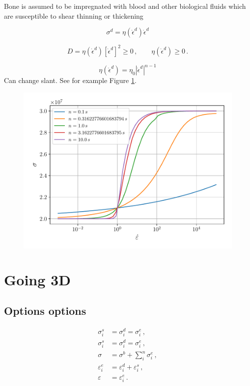 \documentclass[12pt]{article}
\begin{document}
Bone is assumed to be impregnated with blood and other biological fluids which are susceptible to shear thinning or thickening

\begin{equation}
	\sigma^{d} = \eta(\dot{\epsilon}^{d})\dot{\epsilon}^{d}
\end{equation}

\begin{equation}
	D = \eta(\dot{\epsilon}^{d})\left[\dot{\epsilon}^{d}\right]^{2} \geq 0 \,, \qquad \eta(\dot{\epsilon}^{d})\geq 0\,.
\end{equation}

\begin{equation}
	\eta(\dot{\epsilon}^{d}) = \eta_{0} |\dot{\epsilon}^{d}|^{n-1}
\end{equation}
Can change slant. See for example Figure \ref{fig:odw}.
\begin{figure}[!htb]
	\centering
	\includegraphics[width=0.65\linewidth]{odw}
	\caption{ }
	\label{fig:odw}	
\end{figure}

\section{Going 3D}

\subsection{Options options}

\begin{align}
	\sigma^{s}_{i} &= \sigma^{d}_{i} = \sigma^{e}_{i}\,,\\
	\sigma^{s}_{i} &= \sigma^{d}_{i} = \sigma^{e}_{i}\,,\\
	\sigma & = \sigma^{b} + \sum_{i}^{n}\sigma^{e}_{i}\,,\\
	\varepsilon^{e}_{i} &= \varepsilon^{d}_{i} + \varepsilon^{s}_{i}\,,\label{eq:el-kin-1}\\
	\varepsilon& = \varepsilon^{e}_{i}\,.\label{eq:el-kin-2}
\end{align}
\end{document}
